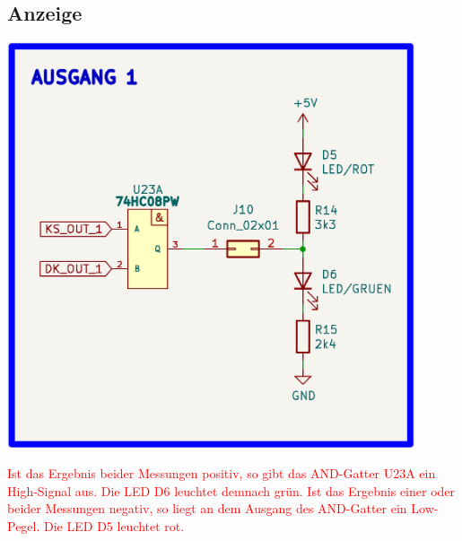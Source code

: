 \newpage
\subsection{Anzeige}

\begin{center}
\includegraphics[width=12cm]{Bilder/Anzeige.png}
\end{center}

\textcolor{red}{
Ist das Ergebnis beider Messungen positiv, so gibt das AND-Gatter U23A ein High-Signal aus. Die LED D6 leuchtet demnach grün. 
Ist das Ergebnis einer oder beider Messungen negativ, so liegt an dem Ausgang des AND-Gatter ein Low-Pegel. Die LED D5 leuchtet rot.}

